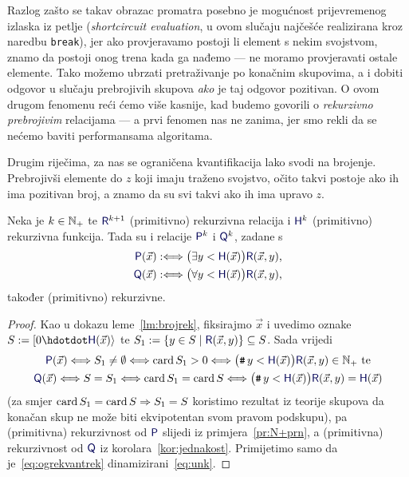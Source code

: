 Razlog zašto se takav obrazac promatra posebno je mogućnost prijevremenog izlaska iz petlje (\emph{shortcircuit evaluation}, u ovom slučaju najčešće realizirana kroz naredbu \texttt{break}), jer ako provjeravamo postoji li element s nekim svojstvom, znamo da postoji onog trena kada ga nađemo --- ne moramo provjeravati ostale elemente. Tako možemo ubrzati pretraživanje po konačnim skupovima, a i dobiti odgovor u slučaju prebrojivih skupova \emph{ako} je taj odgovor pozitivan. O ovom drugom fenomenu reći ćemo više kasnije, kad budemo govorili o \emph{rekurzivno prebrojivim} relacijama --- a prvi fenomen nas ne zanima, jer smo rekli da se nećemo baviti performansama algoritama.

Drugim riječima, za nas se ograničena kvantifikacija lako svodi na brojenje. Prebrojivši elemente do $z$ koji imaju traženo svojstvo, očito takvi postoje ako ih ima pozitivan broj, a znamo da su svi takvi ako ih ima upravo $z$.

\begin{propozicija}[{name=[ograničena kvantifikacija čuva primitivnu rekurzivnost]}]\label{prop:okvantrek}
Neka je $k\in{\mathbb N}_+$ te $\f R^{k+1}$ (primitivno) rekurzivna relacija i $\f H^k$ (primitivno) rekurzivna funkcija. Tada su i relacije $\f P^k$ i $\f Q^k$, zadane s
\begin{align}
    \f P(\vec x):\Longleftrightarrow\bigl(\exists y<\f H(\vec x)\bigr)\f R(\vec x,y)\text,\\
    \f Q(\vec x):\Longleftrightarrow\bigl(\forall y<\f H(\vec x)\bigr)\f R(\vec x,y)\text,
\end{align}
također (primitivno) rekurzivne.
\end{propozicija}
\begin{proof}
    Kao u dokazu leme~\ref{lm:brojrek}, fiksirajmo $\vec x$ i uvedimo oznake $S:=[0\dd \f H(\vec x)\rangle$ te $S_1:=\{y\in S\mid\f R(\vec x,y)\}\subseteq S$. Sada vrijedi
    \begin{gather}
    \label{eq:ogrekvantrek}
        \f P(\vec x)\Longleftrightarrow S_1\ne\emptyset\Longleftrightarrow\card S_1>0\Longleftrightarrow\bigl(\num y<\f H(\vec x)\bigr)\f R(\vec x,y)\in\N_+\text{ te}\\
        \f Q(\vec x)\Longleftrightarrow S=S_1\Longleftrightarrow\card S_1=\card S\Longleftrightarrow\bigl(\num y<\f H(\vec x)\bigr)\f R(\vec x,y)\eq\f H(\vec x)
    \end{gather}
    (za smjer $\operatorname{card} S_1=\operatorname{card} S\Rightarrow S_1=S$ koristimo rezultat iz teorije skupova da konačan skup ne može biti ekvipotentan svom pravom podskupu), pa (primitivna) rekurzivnost od $\f P$ slijedi iz primjera~\ref{pr:N+prn}, a (primitivna) rekurzivnost od $\f Q$ iz korolara~\ref{kor:jednakost}. Primijetimo samo da je~\eqref{eq:ogrekvantrek} dinamizirani~\eqref{eq:unk}.
\end{proof}


